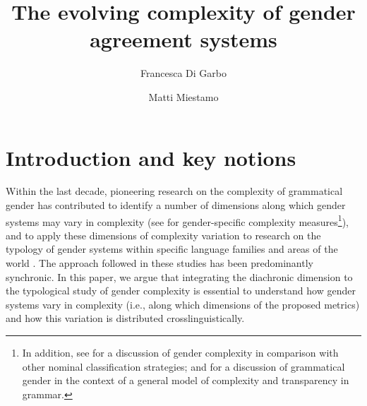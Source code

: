 \documentclass[output=collectionpaper]{langsci/langscibook}
\author{Francesca Di Garbo%
\affiliation{Stockholm University}%
\and%
Matti Miestamo%
\affiliation{University of Helsinki}%
}%
\title{The evolving complexity of gender agreement systems}
\begin{document}
\section{Introduction and key notions}
\label{intro2}
Within the last decade, pioneering research on the complexity of grammatical gender has contributed to identify a number of dimensions along which gender systems may vary in complexity (see \citealt{Audring2014,Audring2017,DiGarbo2016} for gender-specific complexity measures\footnote{In addition, see \citealt{Passer2016b} for a discussion of gender complexity in comparison with other nominal classification strategies; and \citealt{Leufkens2015} for a discussion of grammatical gender in the context of a general model of complexity and transparency in grammar.}), and to apply these dimensions of complexity variation to research on the typology of gender systems within specific language families and areas of the world \citep{DiGarbo2016}. The approach followed in these studies has been predominantly synchronic. In this paper, we argue that integrating the diachronic dimension to the typological study of gender complexity is essential to understand how gender systems vary in complexity (i.e., along which dimensions of the proposed metrics) and how this variation is distributed crosslinguistically.
\end{document}
